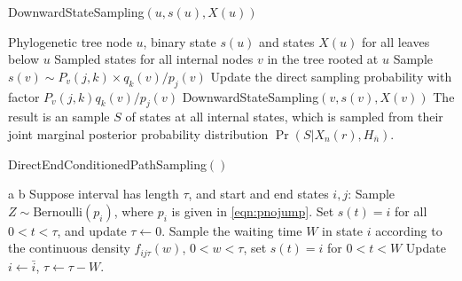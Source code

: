 \documentclass[11pt]{article}
\begin{document}
\begin{algorithm}[h!]
  \begin{algorithmic}[1]
    \caption{DownwardStateSampling$(u, s(u), X(u))$}\label{alg:topdown}
    \REQUIRE Phylogenetic tree node $u$, binary state $s(u)$ and
    states $X(u)$ for all leaves below $u$
    \ENSURE Sampled states for all internal nodes $v$ in the tree
    rooted at $u$
    \STATE Sample $s(v) \sim P_v(j, k) \times q_k(v)\slash p_j(v)$
    \STATE Update the direct sampling probability with factor $P_v(j,k)q_k(v)\slash p_j(v)$
    \STATE DownwardStateSampling$(v, s(v), X(v))$
    \ENDFOR
    \STATE The result is an sample $S$ of states at all internal states,
    which is sampled from their joint marginal posterior probability
    distribution $\Pr(S| X_n(r), H_{\overline{n}}) $.
  \end{algorithmic}
\end{algorithm}

\begin{algorithm}[h!]
  \begin{algorithmic}[1]
    \caption{DirectEndConditionedPathSampling$()$}\label{alg:samplepath}
    \REQUIRE a
    \ENSURE b
    \STATE Suppose interval has length $\tau$, and start and end states $i, j$:
    \STATE Sample $Z\sim \text{Bernoulli}(p_i)$, where
    $p_i$ is given in \eqref{eqn:pnojump}.
    \STATE Set $s(t) = i$ for all $0 < t < \tau$, and update $\tau \gets 0$.
    \ENDIF
    \ENDIF
    \STATE Sample the waiting time $W$ in state $i$ according to the continuous
    density $f_{ij\tau}(w)$, $0< w < \tau$, set $s(t) = i$ for $0 < t < W$
    \STATE Update $i \gets \bar{i}$, $\tau \gets \tau - W$.
    \ENDIF
    \ENDWHILE
  \end{algorithmic}
\end{algorithm}
\end{document}
